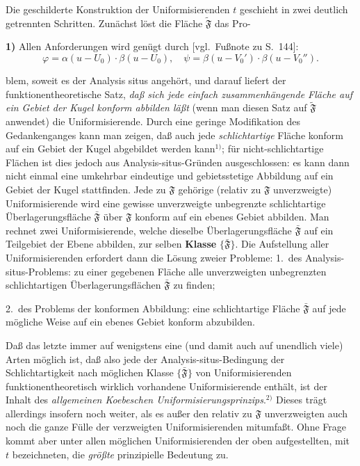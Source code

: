 \documentclass{article}
\begin{document}
Die geschilderte Konstruktion der Uniformisierenden $t$ geschieht in zwei deutlich getrennten Schritten. Zunächst löst die Fläche $\widetilde{\mathfrak{F}}$ das Pro-

\textbf{1)} Allen Anforderungen wird genügt durch [vgl.\ Fußnote zu S.~144]:
\[ \varphi = \alpha(u - U_0) \cdot \beta(u - U_0), \quad \psi = \beta(u - V_0') \cdot \beta(u - V_0''). \]

blem, soweit es der Analysis situs angehört, und darauf liefert der funktionentheoretische Satz, \emph{daß sich jede einfach zusammenhängende Fläche auf ein Gebiet der Kugel konform abbilden läßt} (wenn man diesen Satz auf $\widetilde{\mathfrak{F}}$ anwendet) die Uniformisierende. Durch eine geringe Modifikation des Gedankenganges kann man zeigen, daß auch jede \emph{schlichtartige} Fläche konform auf ein Gebiet der Kugel abgebildet werden kann${}^{1)}$; für nicht-schlichtartige Flächen ist dies jedoch aus Analysis-situs-Gründen ausgeschlossen: es kann dann nicht einmal eine umkehrbar eindeutige und gebietsstetige Abbildung auf ein Gebiet der Kugel stattfinden. Jede zu $\mathfrak{F}$ gehörige (relativ zu $\mathfrak{F}$ unverzweigte) Uniformisierende wird eine gewisse unverzweigte unbegrenzte schlichtartige Überlagerungsfläche $\bar{\mathfrak{F}}$ über $\mathfrak{F}$ konform auf ein ebenes Gebiet abbilden. Man rechnet zwei Uniformisierende, welche dieselbe Überlagerungsfläche $\bar{\mathfrak{F}}$ auf ein Teilgebiet der Ebene abbilden, zur selben \textbf{Klasse} $\{\bar{\mathfrak{F}}\}$. Die Aufstellung aller Uniformisierenden erfordert dann die Lösung zweier Probleme:
1.\ des Analysis-situs-Problems: zu einer gegebenen Fläche alle unverzweigten unbegrenzten schlichtartigen Überlagerungsflächen $\bar{\mathfrak{F}}$ zu finden;

2.\ des Problems der konformen Abbildung: eine schlichtartige Fläche $\bar{\mathfrak{F}}$ auf jede mögliche Weise auf ein ebenes Gebiet konform abzubilden.

Daß das letzte immer auf wenigstens eine (und damit auch auf unendlich viele) Arten möglich ist, daß also jede der Analysis-situs-Bedingung der Schlichtartigkeit nach möglichen Klasse $\{\bar{\mathfrak{F}}\}$ von Uniformisierenden funktionentheoretisch wirklich vorhandene Uniformisierende enthält, ist der Inhalt des \emph{allgemeinen Koebeschen Uniformisierungsprinzips}.${}^{2)}$ Dieses trägt allerdings insofern noch weiter, als es außer den relativ zu $\mathfrak{F}$ unverzweigten auch noch die ganze Fülle der verzweigten Uniformisierenden mitumfaßt. Ohne Frage kommt aber unter allen möglichen Uniformisierenden der oben aufgestellten, mit $t$ bezeichneten, die \emph{größte} prinzipielle Bedeutung zu.
\end{document}
